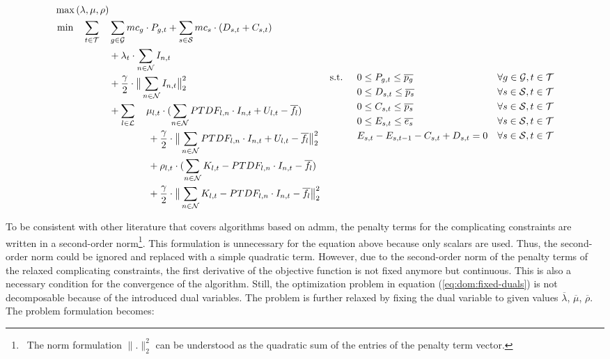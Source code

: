 \begin{subequations}
	\begin{align}
		\max{(\lambda, \mu, \rho)} \label{eq:dom:fixed-duals} \\
		\min \quad \sum_{t\in\mathcal{T}} \quad & \sum_{g\in\mathcal{G}}mc_g \cdot P_{g,t} + \sum_{s\in\mathcal{S}}mc_s \cdot (D_{s,t}+C_{s,t}) \nonumber \\
		 & + \lambda_t \cdot \sum_{n \in \mathcal{N}} I_{n,t} \nonumber \\
		 & + \frac{\gamma}{2} \cdot \big\|\sum_{n \in \mathcal{N}} I_{n,t}\big\|^2_2 \nonumber \\
		 & +  \sum_{l \in \mathcal{L}} \quad \mu_{l,t} \cdot (\sum_{n \in \mathcal{N}} PTDF_{l,n} \cdot I_{n,t} + U_{l,t} - \overline{f_l}) \nonumber \\
		 & \qquad \qquad + \frac{\gamma}{2} \cdot \big\| \sum_{n \in \mathcal{N}} PTDF_{l,n} \cdot I_{n,t} + U_{l,t} - \overline{f_l} \big\|^2_2 \nonumber \\
		 & \qquad \qquad + \rho_{l,t} \cdot (\sum_{n \in \mathcal{N}} K_{l,t} - PTDF_{l,n} \cdot I_{n,t} - \overline{f_l}) \nonumber \\
		 & \qquad \qquad + \frac{\gamma}{2} \cdot \big\|\sum_{n \in \mathcal{N}} K_{l,t} - PTDF_{l,n} \cdot I_{n,t} - \overline{f_l} \big\|^2_2 \nonumber
	\end{align}
	\begin{align}
		 \text{s.t. } \quad & 0 \leq P_{g,t} \leq \overline{p_g} && \forall g \in \set{G}, t \in \set{T}\\
		 & 0 \leq D_{s,t} \leq \overline{p_s} && \forall s \in \set{S}, t \in \set{T} \\
		 & 0 \leq C_{s,t} \leq \overline{p_s} && \forall s \in \set{S}, t \in \set{T} \\
		 & 0 \leq E_{s,t} \leq \overline{e_s} && \forall s \in \set{S}, t \in \set{T} \\
		 & E_{s,t} - E_{s,t-1} - C_{s,t} + D_{s,t} = 0 && \forall s \in \set{S}, t \in \set{T}
	\end{align}
\end{subequations}

To be consistent with other literature that covers algorithms based on \gls{admm}, the penalty terms for the complicating constraints are written in a second-order norm\footnote{~The norm formulation $\big\| . \big\|^2_2$ can be understood as the quadratic sum of the entries of the penalty term vector.}. This formulation is unnecessary for the equation above because only scalars are used. Thus, the second-order norm could be ignored and replaced with a simple quadratic term. However, due to the second-order norm of the penalty terms of the relaxed complicating constraints, the first derivative of the objective function is not fixed anymore but continuous. This is also a necessary condition for the convergence of the algorithm. Still, the optimization problem in equation (\ref{eq:dom:fixed-duals}) is not decomposable because of the introduced dual variables. The problem is further relaxed by fixing the dual variable to given values $\overline{\lambda}$, $\overline{\mu}$, $\overline{\rho}$. The problem formulation becomes:

